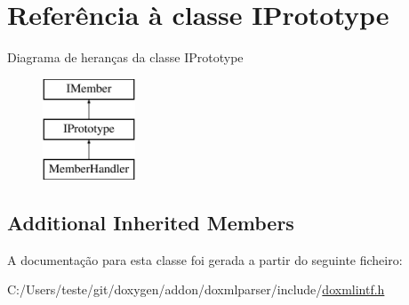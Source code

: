 \hypertarget{class_i_prototype}{\section{Referência à classe I\-Prototype}
\label{class_i_prototype}
}
Diagrama de heranças da classe I\-Prototype\begin{figure}[H]
\begin{center}
\leavevmode
\includegraphics[height=3.000000cm]{class_i_prototype}
\end{center}
\end{figure}
\subsection*{Additional Inherited Members}


A documentação para esta classe foi gerada a partir do seguinte ficheiro\-:\begin{DoxyCompactItemize}
\item 
C\-:/\-Users/teste/git/doxygen/addon/doxmlparser/include/\hyperlink{include_2doxmlintf_8h}{doxmlintf.\-h}\end{DoxyCompactItemize}
